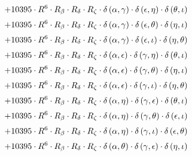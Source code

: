 \begin{subequations}
\begin{gather}
 \\[0.2em] \notag 		 + 10395 \cdot R^{6} \cdot R_{\beta{}} \cdot R_{\delta{}} \cdot R_{\zeta{}} \cdot \delta{}\left(\alpha{}, \gamma{}\right) \cdot \delta{}\left(\epsilon{}, \eta{}\right) \cdot \delta{}\left(\theta{}, \iota{}\right) 
 \\[0.2em] \notag 		 + 10395 \cdot R^{6} \cdot R_{\beta{}} \cdot R_{\delta{}} \cdot R_{\zeta{}} \cdot \delta{}\left(\alpha{}, \gamma{}\right) \cdot \delta{}\left(\epsilon{}, \theta{}\right) \cdot \delta{}\left(\eta{}, \iota{}\right) 
 \\[0.2em] \notag 		 + 10395 \cdot R^{6} \cdot R_{\beta{}} \cdot R_{\delta{}} \cdot R_{\zeta{}} \cdot \delta{}\left(\alpha{}, \gamma{}\right) \cdot \delta{}\left(\epsilon{}, \iota{}\right) \cdot \delta{}\left(\eta{}, \theta{}\right) 
 \\[0.2em] \notag 		 + 10395 \cdot R^{6} \cdot R_{\beta{}} \cdot R_{\delta{}} \cdot R_{\zeta{}} \cdot \delta{}\left(\alpha{}, \epsilon{}\right) \cdot \delta{}\left(\gamma{}, \eta{}\right) \cdot \delta{}\left(\theta{}, \iota{}\right) 
 \\[0.2em] \notag 		 + 10395 \cdot R^{6} \cdot R_{\beta{}} \cdot R_{\delta{}} \cdot R_{\zeta{}} \cdot \delta{}\left(\alpha{}, \epsilon{}\right) \cdot \delta{}\left(\gamma{}, \theta{}\right) \cdot \delta{}\left(\eta{}, \iota{}\right) 
 \\[0.2em] \notag 		 + 10395 \cdot R^{6} \cdot R_{\beta{}} \cdot R_{\delta{}} \cdot R_{\zeta{}} \cdot \delta{}\left(\alpha{}, \epsilon{}\right) \cdot \delta{}\left(\gamma{}, \iota{}\right) \cdot \delta{}\left(\eta{}, \theta{}\right) 
 \\[0.2em] \notag 		 + 10395 \cdot R^{6} \cdot R_{\beta{}} \cdot R_{\delta{}} \cdot R_{\zeta{}} \cdot \delta{}\left(\alpha{}, \eta{}\right) \cdot \delta{}\left(\gamma{}, \epsilon{}\right) \cdot \delta{}\left(\theta{}, \iota{}\right) 
 \\[0.2em] \notag 		 + 10395 \cdot R^{6} \cdot R_{\beta{}} \cdot R_{\delta{}} \cdot R_{\zeta{}} \cdot \delta{}\left(\alpha{}, \eta{}\right) \cdot \delta{}\left(\gamma{}, \theta{}\right) \cdot \delta{}\left(\epsilon{}, \iota{}\right) 
 \\[0.2em] \notag 		 + 10395 \cdot R^{6} \cdot R_{\beta{}} \cdot R_{\delta{}} \cdot R_{\zeta{}} \cdot \delta{}\left(\alpha{}, \eta{}\right) \cdot \delta{}\left(\gamma{}, \iota{}\right) \cdot \delta{}\left(\epsilon{}, \theta{}\right) 
 \\[0.2em] \notag 		 + 10395 \cdot R^{6} \cdot R_{\beta{}} \cdot R_{\delta{}} \cdot R_{\zeta{}} \cdot \delta{}\left(\alpha{}, \theta{}\right) \cdot \delta{}\left(\gamma{}, \epsilon{}\right) \cdot \delta{}\left(\eta{}, \iota{}\right) 

\end{gather}
\end{subequations}
